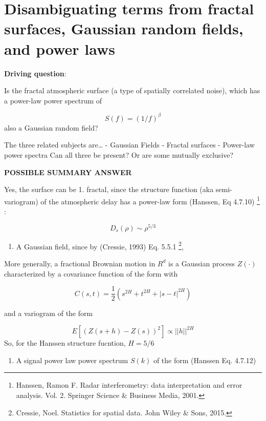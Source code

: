 \hypertarget{disambiguating-terms-from-fractal-surfaces-gaussian-random-fields-and-power-laws}{%
\section{Disambiguating terms from fractal surfaces, Gaussian random
fields, and power
laws}\label{disambiguating-terms-from-fractal-surfaces-gaussian-random-fields-and-power-laws}}

\textbf{Driving question}:

Is the fractal atmospheric surface (a type of spatially correlated
noise), which has a power-law power spectrum of

\[S(f) = (1/f)^{\beta}\] also a Gaussian random field?

The three related subjects are\ldots{} - Gaussian Fields - Fractal
surfaces - Power-law power spectra Can all three be present? Or are some
mutually exclusive?

\textbf{POSSIBLE SUMMARY ANSWER}

Yes, the surface can be 1. fractal, since the structure function (aka
semi-variogram) of the atmospheric delay has a power-law form (Hanssen,
Eq 4.7.10) \footnote{Hanssen, Ramon F. Radar interferometry: data
  interpretation and error analysis. Vol. 2. Springer Science \&
  Business Media, 2001.} :

\[D_s(\rho) \sim \rho^{5/3}\]

\begin{enumerate}
\def\labelenumi{\arabic{enumi}.}
\setcounter{enumi}{1}
\tightlist
\item
  A Gaussian field, since by (Cressie, 1993) Eq. 5.5.1 \footnote{Cressie,
    Noel. Statistics for spatial data. John Wiley \& Sons, 2015.},
\end{enumerate}

More generally, a fractional Brownian motion in \(R^d\) is a Gaussian
process \(Z(\cdot)\) characterized by a covariance function of the form
with

\[C(s, t) = \frac{1}{2}\left(s^{2H} + t^{2H} + |s-t|^{2H}\right)\]

and a variogram of the form

\[E[(Z(s + h) - Z(s))^2] \propto ||h||^{2H}\] So, for the Hanssen
structure fucntion, \(H=5/6\)

\begin{enumerate}
\def\labelenumi{\arabic{enumi}.}
\setcounter{enumi}{2}
\tightlist
\item
  A signal power law power spectrum \(S(k)\) of the form (Hanssen Eq.
  4.7.12)
\end{enumerate}

